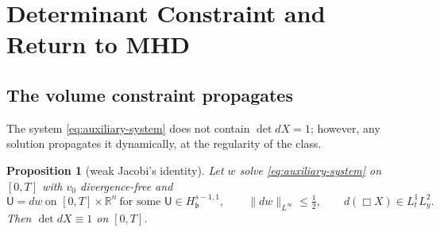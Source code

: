 \documentclass[11pt,reqno]{amsart}
\theoremstyle{plain}
\newtheorem{proposition}[theorem]{Proposition}
\theoremstyle{definition}
\theoremstyle{remark}
\numberwithin{equation}{section}
\newcommand{\breg}{\mathfrak b}
\newcommand{\Ufield}{\mathsf U}
\newcommand{\Real}{\mathbb R}
\newcommand{\Rn}{\Real^n}
\begin{document}
\section{Determinant Constraint and Return to MHD}\label{sec:return-mhd}
\subsection{The volume constraint propagates}
\label{ssec:constraint}

The system \eqref{eq:auxiliary-system} does not contain $\det dX=1$; however, any solution
propagates it dynamically, at the regularity of the class.

\begin{proposition}[weak Jacobi's identity]\label{prop:constraint}
Let $w$ solve \eqref{eq:auxiliary-system} on $[0,T]$ with $v_0$ divergence-free and
\begin{equation}\label{eq:constraint-hyp}
\Ufield=dw\ \text{on }[0,T]\times\Rn
\ \text{for some }\Ufield\in H^{s-1,1}_{\breg},
\qquad \big\|dw\big\|_{L^\infty}\le\tfrac12,\qquad
d(\Box X)\in L^1_tL^2_{y} .
\end{equation}
Then $\det dX\equiv1$ on $[0,T]$.
\end{proposition}
\end{document}
